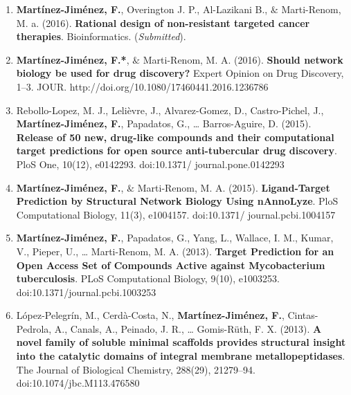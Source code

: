 \documentclass[11pt, b5paper,twoside]{tesi_upf}
\begin{document}
\begin{enumerate}

\item  \textbf{Martínez-Jiménez, F.}, Overington J. P., Al-Lazikani B., $\&$ Marti-Renom, M. a. (2016). \textbf{Rational design of non-resistant targeted cancer therapies}. Bioinformatics.  (\textit{Submitted}). 

\item \textbf{Martínez-Jiménez, F.*}, $\&$ Marti-Renom, M. A. (2016). \textbf{Should network biology be used for drug discovery?} Expert Opinion on Drug Discovery, 1–3. JOUR. http://doi.org/10.1080/17460441.2016.1236786

\item Rebollo-Lopez, M. J., Lelièvre, J., Alvarez-Gomez, D., Castro-Pichel, J., \textbf{Martínez-Jiménez, F.}, Papadatos, G., … Barros-Aguire, D. (2015). \textbf{Release of 50 new, drug-like compounds and their computational target predictions for open source anti-tubercular drug discovery}. PloS One, 10(12), e0142293. doi:10.1371/ journal.pone.0142293

\item \textbf{Martínez-Jiménez, F.}, $\&$ Marti-Renom, M. A. (2015). \textbf{Ligand-Target Prediction by Structural Network Biology Using nAnnoLyze}. PloS Computational Biology, 11(3), e1004157. doi:10.1371/ journal.pcbi.1004157

\item \textbf{Martínez-Jiménez, F.}, Papadatos, G., Yang, L., Wallace, I. M., Kumar, V., Pieper, U., … Marti-Renom, M. A. (2013). \textbf{Target Prediction for an Open Access Set of Compounds Active against Mycobacterium tuberculosis}. PLoS Computational Biology, 9(10), e1003253. doi:10.1371/journal.pcbi.1003253

\item López-Pelegrín, M., Cerdà-Costa, N., \textbf{Martínez-Jiménez, F.}, Cintas-Pedrola, A., Canals, A., Peinado, J. R., … Gomis-Rüth, F. X. (2013). \textbf{A novel family of soluble minimal scaffolds provides structural insight into the catalytic domains of integral membrane metallopeptidases}. The Journal of Biological Chemistry, 288(29), 21279–94. doi:10.1074/jbc.M113.476580

\end{enumerate}



\end{document}
